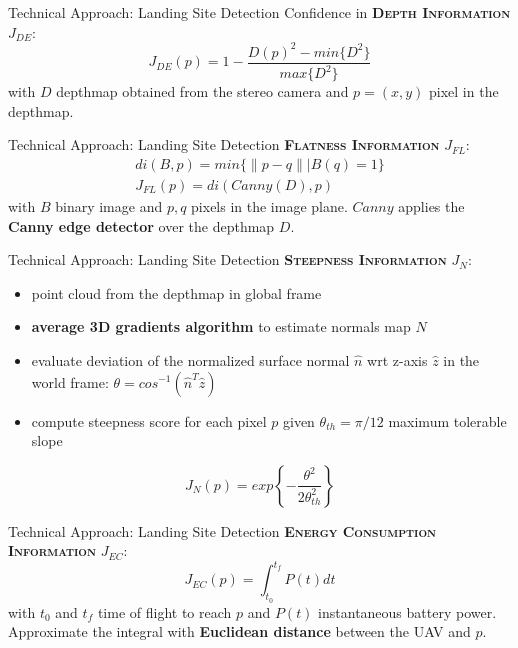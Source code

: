 \documentclass[10pt]{beamer}
\begin{document}
    \begin{frame}{Technical Approach: Landing Site Detection}
        \justifying
        Confidence in \textbf{\textsc{Depth Information}} $J_{DE}$:
        \begin{equation*}
            J_{DE}(p) = 1 - \frac{D(p)^2 - min\{D^2\}}{max\{D^2\}}
        \end{equation*}
        with $D$ depthmap obtained from the stereo camera and $p=(x,y)$
        pixel in the depthmap.
    \end{frame}

    \begin{frame}{Technical Approach: Landing Site Detection}
        \justifying
        \textbf{\textsc{Flatness Information}} $J_{FL}$:
        \begin{gather*}
            di(B, p) = min\Big\{\|p-q\| \Big| B(q)=1\Big\} \\
            J_{FL}(p) = di(Canny(D), p)
        \end{gather*}
        with $B$ binary image and $p, q$ pixels in the image plane. $Canny$
        applies the \textbf{Canny edge detector} over the depthmap $D$.
    \end{frame}

    \begin{frame}{Technical Approach: Landing Site Detection}
        \justifying
        \textbf{\textsc{Steepness Information}} $J_{N}$:
        \begin{itemize}
            \item point cloud from the depthmap in global frame
            \item \textbf{average 3D gradients algorithm} to estimate normals map $N$
            \item evaluate deviation of the normalized surface normal
                $\hat{n}$ wrt z-axis $\hat{z}$ in the world frame:
                $\theta = cos^{-1}(\hat{n}^T\hat{z})$
            \item compute steepness score for each pixel $p$ given
                $\theta_{th}=\pi/12$ maximum tolerable slope
        \end{itemize}
        \begin{equation*}
            J_N(p) = exp\left\{ -\frac{\theta^2}{2\theta^2_{th}} \right\}
        \end{equation*}
    \end{frame}

    \begin{frame}{Technical Approach: Landing Site Detection}
        \justifying
        \textbf{\textsc{Energy Consumption Information}} $J_{EC}$:
        \begin{equation*}
            J_{EC}(p) = \int_{t_0}^{t_f} P(t)dt
        \end{equation*}
        with $t_0$ and $t_f$ time of flight to reach $p$ and $P(t)$
        instantaneous battery power. Approximate the integral with
        \textbf{Euclidean distance} between the UAV and $p$.
    \end{frame}
\end{document}
